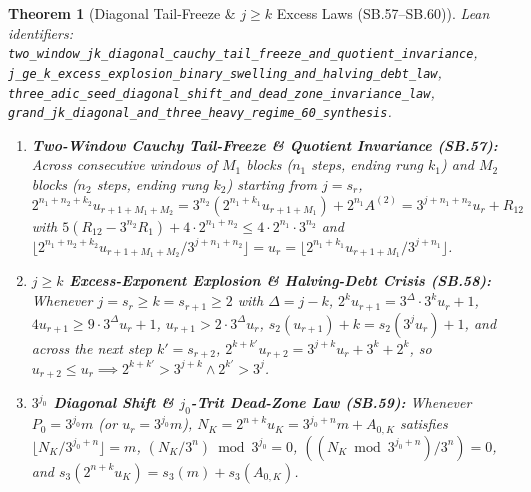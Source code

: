 \documentclass[11pt]{article}
\newtheorem{theorem}{Theorem}[section]
\begin{document}
\begin{theorem}[Diagonal Tail-Freeze \& $j \ge k$ Excess Laws (SB.57--SB.60)]
\emph{Lean identifiers:} \nolinkurl{two_window_jk_diagonal_cauchy_tail_freeze_and_quotient_invariance}, \nolinkurl{j_ge_k_excess_explosion_binary_swelling_and_halving_debt_law}, \nolinkurl{three_adic_seed_diagonal_shift_and_dead_zone_invariance_law}, \nolinkurl{grand_jk_diagonal_and_three_heavy_regime_60_synthesis}.
\begin{enumerate}
  \item \textbf{Two-Window Cauchy Tail-Freeze \& Quotient Invariance (SB.57):} Across consecutive windows of $M_1$ blocks ($n_1$ steps, ending rung $k_1$) and $M_2$ blocks ($n_2$ steps, ending rung $k_2$) starting from $j = s_r$, $2^{n_1+n_2+k_2} u_{r+1+M_1+M_2} = 3^{n_2}(2^{n_1+k_1} u_{r+1+M_1}) + 2^{n_1} A^{(2)} = 3^{j+n_1+n_2} u_r + R_{12}$ with $5(R_{12} - 3^{n_2} R_1) + 4 \cdot 2^{n_1+n_2} \le 4 \cdot 2^{n_1} \cdot 3^{n_2}$ and $\lfloor 2^{n_1+n_2+k_2} u_{r+1+M_1+M_2} / 3^{j+n_1+n_2} \rfloor = u_r = \lfloor 2^{n_1+k_1} u_{r+1+M_1} / 3^{j+n_1} \rfloor$.
  \item \textbf{$j \ge k$ Excess-Exponent Explosion \& Halving-Debt Crisis (SB.58):} Whenever $j = s_r \ge k = s_{r+1} \ge 2$ with $\Delta = j - k$, $2^k u_{r+1} = 3^\Delta \cdot 3^k u_r + 1$, $4 u_{r+1} \ge 9 \cdot 3^\Delta u_r + 1$, $u_{r+1} > 2 \cdot 3^\Delta u_r$, $s_2(u_{r+1}) + k = s_2(3^j u_r) + 1$, and across the next step $k' = s_{r+2}$, $2^{k+k'} u_{r+2} = 3^{j+k} u_r + 3^k + 2^k$, so $u_{r+2} \le u_r \implies 2^{k+k'} > 3^{j+k} \wedge 2^{k'} > 3^j$.
  \item \textbf{$3^{j_0}$ Diagonal Shift \& $j_0$-Trit Dead-Zone Law (SB.59):} Whenever $P_0 = 3^{j_0} m$ (or $u_r = 3^{j_0} m$), $N_K = 2^{n+k} u_K = 3^{j_0+n} m + A_{0,K}$ satisfies $\lfloor N_K / 3^{j_0+n} \rfloor = m$, $(N_K / 3^n) \bmod 3^{j_0} = 0$, $((N_K \bmod 3^{j_0+n}) / 3^n) = 0$, and $s_3(2^{n+k} u_K) = s_3(m) + s_3(A_{0,K})$.
\end{enumerate}
\end{theorem}
\end{document}
